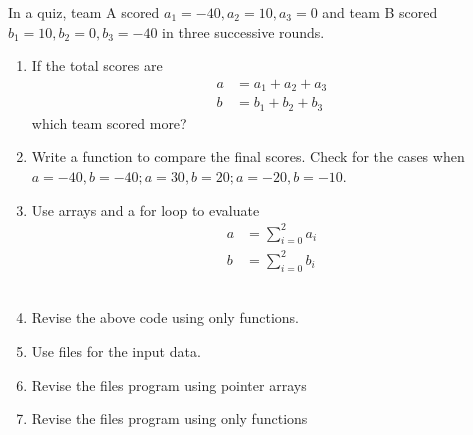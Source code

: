 In a quiz, team A scored $a_1 = -40, a_2=10, a_3=0$ and team B scored $b_1=10, b_2=0, b_3=-40$ in three successive rounds.
\begin{enumerate}[label=\thesubsection.\arabic*, ref=\thesubsection.\theenumi]
\item  If the total scores are 
	\begin{align}
		a &= a_1+a_2+a_3
		\\
		b &= b_1+b_2+b_3
	\end{align}
	which team scored more? 
	\\
	\solution 
	
\item Write a function to compare the final scores.  Check for the cases when $a = -40, b = -40; a = 30, b = 20; a = -20, b = -10$.
	\\
	\solution 
	
\item Use arrays and a for loop to evaluate 
	\begin{align}
		a &= \sum_{i=0}^{2}a_i
		\\
		b &= \sum_{i=0}^{2}b_i
	\end{align}
	\\
	\solution 
	
\item Revise the above code using only functions.
	\\
	\solution 
	
\item Use files for the input data.
	\\
	\solution 
	
\item Revise the files program using pointer arrays
	\\
	\solution 
	
\item Revise the files program using only functions
	\\
	\solution 
	
\end{enumerate}
